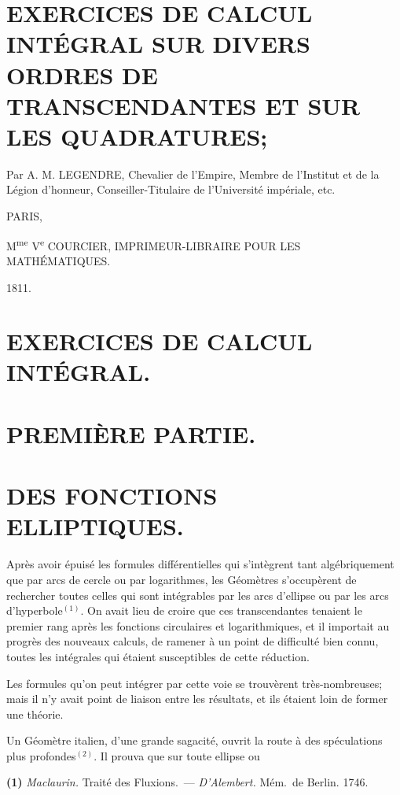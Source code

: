\documentclass{article}
\begin{document}

\section*{EXERCICES DE CALCUL INTÉGRAL SUR DIVERS ORDRES DE TRANSCENDANTES ET SUR LES QUADRATURES;}

Par A. M. LEGENDRE, Chevalier de l'Empire, Membre de l'Institut et de la Légion d'honneur, Conseiller-Titulaire de l'Université impériale, etc.

PARIS,

M\textsuperscript{me} V\textsuperscript{e} COURCIER, IMPRIMEUR-LIBRAIRE POUR LES MATHÉMATIQUES.

1811.


\section*{EXERCICES DE CALCUL INTÉGRAL.}

\section*{PREMIÈRE PARTIE.}

\section*{DES FONCTIONS ELLIPTIQUES.}

Après avoir épuisé les formules différentielles qui s'intègrent tant algébriquement que par arcs de cercle ou par logarithmes, les Géomètres s'occupèrent de rechercher toutes celles qui sont intégrables par les arcs d'ellipse ou par les arcs d'hyperbole${}^{(1)}$. On avait lieu de croire que ces transcendantes tenaient le premier rang après les fonctions circulaires et logarithmiques, et il importait au progrès des nouveaux calculs, de ramener à un point de difficulté bien connu, toutes les intégrales qui étaient susceptibles de cette réduction.

Les formules qu'on peut intégrer par cette voie se trouvèrent très-nombreuses; mais il n'y avait point de liaison entre les résultats, et ils étaient loin de former une théorie.

Un Géomètre italien, d'une grande sagacité, ouvrit la route à des spéculations plus profondes${}^{(2)}$. Il prouva que sur toute ellipse ou

\textbf{(1)} \emph{Maclaurin.} Traité des Fluxions.~--- \emph{D'Alembert.} Mém.\ de Berlin. 1746.
\end{document}
